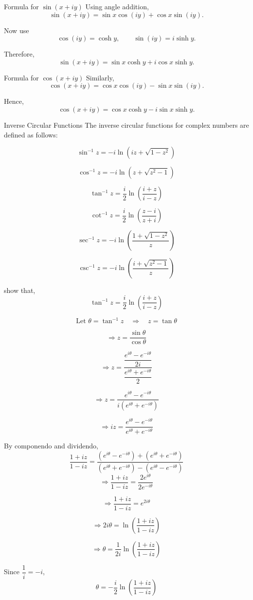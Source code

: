 \documentclass[11pt]{beamer}
\theoremstyle{definition}
\theoremstyle{plain}
\begin{document}
\begin{frame}{Formula for \(\sin(x+iy)\)}
Using angle addition,
\[
\sin(x+iy)=\sin x\cos(iy)+\cos x\sin(iy).
\]

Now use
\[
\cos(iy)=\cosh y,
\qquad
\sin(iy)=i\sinh y.
\]

Therefore,
\[
\sin(x+iy)=\sin x\cosh y+i\cos x\sinh y.
\]
\end{frame}

\begin{frame}{Formula for \(\cos(x+iy)\)}
Similarly,
\[
\cos(x+iy)=\cos x\cos(iy)-\sin x\sin(iy).
\]

Hence,
\[
\cos(x+iy)=\cos x\cosh y-i\sin x\sinh y.
\]
\end{frame}
\begin{frame}{Inverse Circular Functions}
  The inverse circular functions for complex numbers are defined as follows:

\[
\sin^{-1} z = -i \ln \left( iz + \sqrt{1 - z^2} \right)
\]

\[
\cos^{-1} z = -i \ln \left( z + \sqrt{z^2 - 1} \right)
\]

\[
\tan^{-1} z = \frac{i}{2} \ln \left( \frac{i + z}{i - z} \right)
\]

\[
\cot^{-1} z = \frac{i}{2} \ln \left( \frac{z - i}{z + i} \right)
\]

\[
\sec^{-1} z = -i \ln \left( \frac{1 + \sqrt{1 - z^2}}{z} \right)
\]

\[
\csc^{-1} z = -i \ln \left( \frac{i + \sqrt{z^2 - 1}}{z} \right)
\]
\end{frame}
\begin{frame}
  show that, \[
\tan^{-1} z = \frac{i}{2} \ln \left( \frac{i + z}{i - z} \right)
\]

  \[
\text{Let } \theta=\tan^{-1}z
\quad\Rightarrow\quad
z=\tan\theta
\]

\[
\Rightarrow z=\frac{\sin\theta}{\cos\theta}
\]

\[
\Rightarrow z=
\frac{\dfrac{e^{i\theta}-e^{-i\theta}}{2i}}
{\dfrac{e^{i\theta}+e^{-i\theta}}{2}}
\]

\[
\Rightarrow z=
\frac{e^{i\theta}-e^{-i\theta}}
{i\left(e^{i\theta}+e^{-i\theta}\right)}
\]

\[
\Rightarrow iz=
\frac{e^{i\theta}-e^{-i\theta}}
{e^{i\theta}+e^{-i\theta}}
\]
\end{frame}
\begin{frame}
By componendo and dividendo,
\[
\frac{1+iz}{1-iz}
=
\frac{(e^{i\theta}-e^{-i\theta})+(e^{i\theta}+e^{-i\theta})}
{(e^{i\theta}+e^{-i\theta})-(e^{i\theta}-e^{-i\theta})}
\]
  \[
\Rightarrow
\frac{1+iz}{1-iz}
=
\frac{2e^{i\theta}}{2e^{-i\theta}}
\]

\[
\Rightarrow
\frac{1+iz}{1-iz}=e^{2i\theta}
\]

\[
\Rightarrow
2i\theta=\ln\left(\frac{1+iz}{1-iz}\right)
\]

\[
\Rightarrow
\theta=\frac{1}{2i}\ln\left(\frac{1+iz}{1-iz}\right)
\]

Since \(\dfrac{1}{i}=-i\),
\[
\theta=-\frac{i}{2}\ln\left(\frac{1+iz}{1-iz}\right)
\]
\end{frame}
\end{document}
